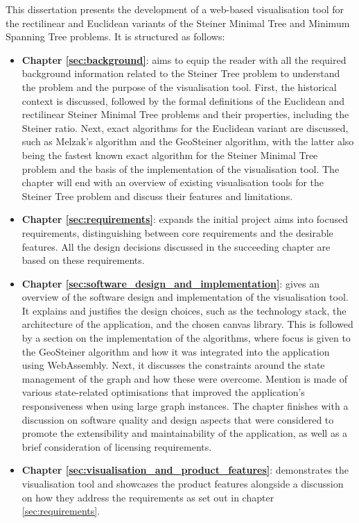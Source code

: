 \documentclass{l4proj}
\begin{document}
This dissertation presents the development of a web-based visualisation tool for the rectilinear and Euclidean variants of the Steiner Minimal Tree and Minimum Spanning Tree problems. It is structured as follows:
\begin{itemize}
    \item \textbf{Chapter \ref{sec:background}}: aims to equip the reader with all the required background information related to the Steiner Tree problem to understand the problem and the purpose of the visualisation tool. First, the historical context is discussed, followed by the formal definitions of the Euclidean and rectilinear Steiner Minimal Tree problems and their properties, including the Steiner ratio. Next, exact algorithms for the Euclidean variant are discussed, such as Melzak's algorithm and the GeoSteiner algorithm, with the latter also being the fastest known exact algorithm for the Steiner Minimal Tree problem and the basis of the implementation of the visualisation tool. The chapter will end with an overview of existing visualisation tools for the Steiner Tree problem and discuss their features and limitations.
    \item \textbf{Chapter \ref{sec:requirements}}: expands the initial project aims into focused requirements, distinguishing between core requirements and the desirable features. All the design decisions discussed in the succeeding chapter are based on these requirements.
    \item \textbf{Chapter \ref{sec:software_design_and_implementation}}: gives an overview of the software design and implementation of the visualisation tool. It explains and justifies the design choices, such as the technology stack, the architecture of the application, and the chosen canvas library. This is followed by a section on the implementation of the algorithms, where focus is given to the GeoSteiner algorithm and how it was integrated into the application using WebAssembly. Next, it discusses the constraints around the state management of the graph and how these were overcome. Mention is made of various state-related optimisations that improved the application's responsiveness when using large graph instances. The chapter finishes with a discussion on software quality and design aspects that were considered to promote the extensibility and maintainability of the application, as well as a brief consideration of licensing requirements.
    \item \textbf{Chapter \ref{sec:visualisation_and_product_features}}: demonstrates the visualisation tool and showcases the product features alongside a discussion on how they address the requirements as set out in chapter \ref{sec:requirements}.

\end{itemize}
\end{document}
